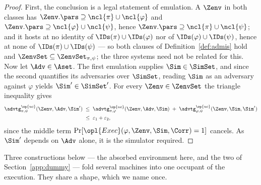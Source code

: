 \documentclass[10pt,oneside,openany]{book}
\theoremstyle{accentdef}
\theoremstyle{accentplain}
\begin{document}
\begin{proof}
First, the conclusion is a legal statement of emulation. A $\Zenv$ in both classes has
$\Zenv.\pars \supseteq \ncl{\pi} \cup \ncl{\varphi}$ and
$\Zenv.\pars \supseteq \ncl{\varphi} \cup \ncl{\psi}$, hence
$\Zenv.\pars \supseteq \ncl{\pi} \cup \ncl{\psi}$; and it hosts at no identity of
$\IDs(\pi) \cup \IDs(\varphi)$ nor of $\IDs(\varphi) \cup \IDs(\psi)$, hence at none of
$\IDs(\pi) \cup \IDs(\psi)$ --- so both clauses of Definition~\ref{def:admis} hold and
$\ZenvSet \subseteq \ZenvSet_{\pi,\psi}$;
the three systems need not be related for this. Now let $\Adv \in \Aset$. The first
emulation supplies $\Sim \in \SimSet$, and since the second quantifies its adversaries over
$\SimSet$, reading $\Sim$ as an adversary against $\varphi$ yields $\Sim' \in \SimSet'$.
For every $\Zenv \in \ZenvSet$ the triangle inequality gives
\[
  \begin{aligned}
  \advtg^{\op{uc}}_{\pi,\psi}(\Zenv,\Adv,\Sim')
  &\;\leq\;
  \advtg^{\op{uc}}_{\pi,\varphi}(\Zenv,\Adv,\Sim) \;+\; \advtg^{\op{uc}}_{\varphi,\psi}(\Zenv,\Sim,\Sim') \\
  &\;\leq\; \varepsilon_1 + \varepsilon_2 ,
  \end{aligned}
\]
since the middle term $\Pr[\opl{Exec}(\varphi,\Zenv,\Sim,\Corr) = 1]$ cancels. As $\Sim'$
depends on $\Adv$ alone, it is the simulator required.
\end{proof}

Three constructions below --- the absorbed environment here, and the two of
Section~\ref{app:dummy} --- fold several machines into one occupant of the execution. They share
a shape, which we name once.
\end{document}
